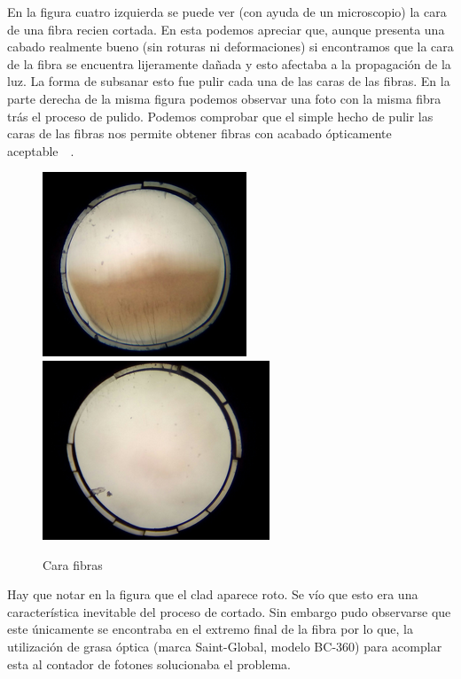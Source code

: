 En la figura cuatro izquierda se puede ver (con ayuda de un microscopio) la cara de una fibra recien cortada. En esta podemos apreciar que, aunque presenta una cabado realmente bueno (sin roturas ni deformaciones) si encontramos que la cara de la fibra se encuentra lijeramente dañada y esto afectaba a la propagación de la luz. La forma de subsanar esto fue pulir cada una de las caras de las fibras. En la parte derecha de la misma figura podemos observar una foto con la misma fibra trás el proceso de pulido. Podemos comprobar que el simple hecho de pulir las caras de las fibras nos permite obtener fibras con acabado ópticamente aceptable~\cite{Alberto}~\cite{manual}.

\begin{figure}[htb]
\centering
{
\includegraphics[scale=0.5]{SinPulir.png} 
}
{
\includegraphics[scale=0.5]{Pulida.png} 
}
\caption{Cara fibras\label{Pulido}}
\end{figure} 

Hay que notar en la figura que el clad aparece roto. Se vío que esto era una característica inevitable del proceso de cortado. Sin embargo pudo observarse que este únicamente se encontraba en el extremo final de la fibra por lo que, la utilización de grasa óptica (marca Saint-Global, modelo BC-360) para acomplar esta al contador de fotones solucionaba el problema. 


